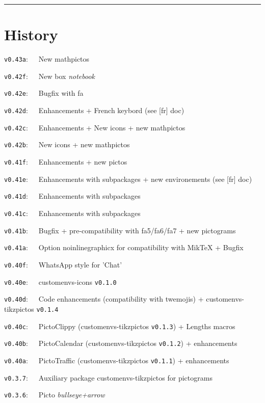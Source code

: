 \documentclass[english,11pt,a4paper]{article}
\begin{document}
\tableofcontents

\vspace*{5mm}

\hrule

\vfill

\section{History}

\verb|v0.43a|:~~~New mathpictos

\verb|v0.42f|:~~~New box \textit{notebook}

\verb|v0.42e|:~~~Bugfix with \textsf{fa}

\verb|v0.42d|:~~~Enhancements + French keybord (see [fr] doc)

\verb|v0.42c|:~~~Enhancements + New icons + new mathpictos

\verb|v0.42b|:~~~New icons + new mathpictos

\verb|v0.41f|:~~~Enhancements + new pictos

\verb|v0.41e|:~~~Enhancements with subpackages + new environements (see \textsf{[fr]} doc)

\verb|v0.41d|:~~~Enhancements with subpackages

\verb|v0.41c|:~~~Enhancements with subpackages

\verb|v0.41b|:~~~Bugfix + pre-compatibility with \textsf{fa5/fa6/fa7} + new pictograms

\verb|v0.41a|:~~~Option \textsf{noinlinegraphicx} for compatibility with \textsf{MikTeX} + Bugfix

\verb|v0.40f|:~~~\textsf{WhatsApp} style for 'Chat'

\verb|v0.40e|:~~~\textsf{customenvs-icons} \texttt{v0.1.0}

\verb|v0.40d|:~~~Code enhancements (compatibility  with twemojis) + \textsf{customenvs-tikzpictos} \texttt{v0.1.4}

\verb|v0.40c|:~~~PictoClippy (\textsf{customenvs-tikzpictos} \texttt{v0.1.3}) + Lengths macros

\verb|v0.40b|:~~~PictoCalendar (\textsf{customenvs-tikzpictos} \texttt{v0.1.2}) + enhancements

\verb|v0.40a|:~~~PictoTraffic (\textsf{customenvs-tikzpictos} \texttt{v0.1.1}) + enhancements

\verb|v0.3.7|:~~~Auxiliary package \textsf{customenvs-tikzpictos} for pictograms

\verb|v0.3.6|:~~~Picto \textit{bullseye+arrow}
\end{document}

